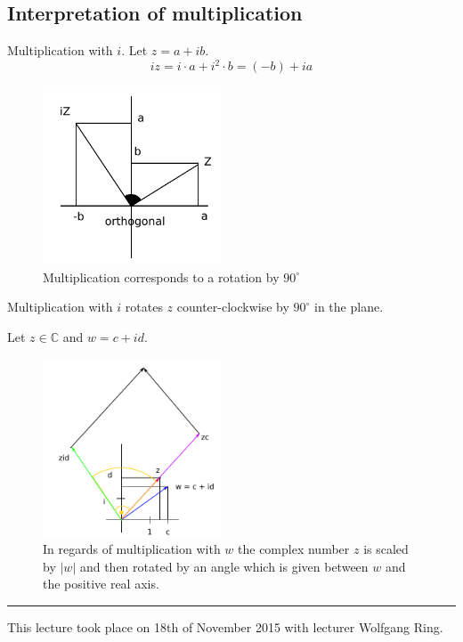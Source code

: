 \documentclass[a4paper,landscape,twocolumn]{article}
\theoremstyle{definition}
\newcommand\abs[1]{\left|#1\right|}
\newcommand\meta[3]{\hrule{} This #1 took place on #2 with lecturer #3.\par}
\begin{document}
\subsection{Interpretation of multiplication}
%
Multiplication with $i$. Let $z = a + ib$.
\[ iz = i\cdot a + i^2 \cdot b = (-b) + i a \]

\begin{figure}[!h]
  \begin{center}
    \includegraphics[width=200px]{img/complex_number_multiplication.pdf}
    \caption{Multiplication corresponds to a rotation by $90^\circ$}
  \end{center}
\end{figure}

Multiplication with $i$ rotates $z$ counter-clockwise by $90^\circ$
in the plane.

Let $z \in \mathbb C$ and $w = c + id$.

\begin{figure}[!h]
  \begin{center}
    \includegraphics[width=200px]{img/complex_numbers_multiplication_with_b.pdf}
    \caption{
      In regards of multiplication with $w$ the complex number $z$ is scaled by $\abs{w}$
      and then rotated by an angle which is given between $w$ and the positive real axis.
    }
  \end{center}
\end{figure}

\meta{lecture}{18th of November 2015}{Wolfgang Ring}
\end{document}

